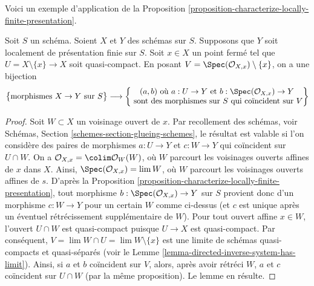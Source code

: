 \noindent
Voici un exemple d'application de la
Proposition \ref{proposition-characterize-locally-finite-presentation}.

\begin{lemma}
\label{lemma-morphism-glueing-near-closed-point}
Soit $S$ un schéma. Soient $X$ et $Y$ des schémas sur $S$. Supposons que
$Y$ soit localement de présentation finie sur $S$. Soit $x \in X$ un point
fermé tel que $U = X \setminus \{x\} \to X$ soit quasi-compact. En posant
$V = \Spec(\mathcal{O}_{X, x}) \setminus \{x\}$, on a une bijection
$$
\left\{
\begin{matrix}
\text{morphismes }X \to Y\text{ sur }S
\end{matrix}
\right\}
\longrightarrow
\left\{
\begin{matrix}
(a, b)\text{ où }
a : U \to Y\text{ et }b : \Spec(\mathcal{O}_{X, x}) \to Y\\
\text{ sont des morphismes sur }S
\text{ qui coïncident sur }V
\end{matrix}
\right\}
$$
\end{lemma}

\begin{proof}
Soit $W \subset X$ un voisinage ouvert de $x$. Par recollement des schémas,
voir Schémas, Section \ref{schemes-section-glueing-schemes}, le résultat est
valable si l'on considère des paires de morphismes $a : U \to Y$ et
$c : W \to Y$ qui coïncident sur $U \cap W$. On a
$\mathcal{O}_{X, x} = \colim \mathcal{O}_W(W)$, où $W$ parcourt les
voisinages ouverts affines de $x$ dans $X$. Ainsi,
$\Spec(\mathcal{O}_{X, x}) = \lim W$, où $W$ parcourt les voisinages ouverts
affines de $s$. D'après la
Proposition \ref{proposition-characterize-locally-finite-presentation}, tout
morphisme $b : \Spec(\mathcal{O}_{X, x}) \to Y$ sur $S$ provient donc d'un
morphisme $c : W \to Y$ pour un certain $W$ comme ci-dessus (et $c$ est
unique après un éventuel rétrécissement supplémentaire de $W$). Pour tout
ouvert affine $x \in W$, l'ouvert $U \cap W$ est quasi-compact puisque
$U \to X$ est quasi-compact. Par conséquent,
$V = \lim W \cap U = \lim W \setminus \{x\}$ est une limite de schémas
quasi-compacts et quasi-séparés (voir le
Lemme \ref{lemma-directed-inverse-system-has-limit}). Ainsi, si $a$ et $b$
coïncident sur $V$, alors, après avoir rétréci $W$, $a$ et $c$ coïncident sur
$U \cap W$ (par la même proposition). Le lemme en résulte.
\end{proof}







